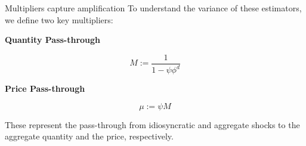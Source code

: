 \documentclass[aspectratio=169,11pt]{beamer}
\begin{document}
\begin{frame}{Multipliers capture amplification}
    \vspace{0.5cm}
    \centering
    To understand the variance of these estimators, we define two key multipliers:

    \vspace{0.8cm}
    \begin{minipage}{0.45\textwidth}
        \centering
        \textbf{Quantity Pass-through}

        \vspace{0.3cm}
        \begin{equation*}
            M := \frac{1}{1 - \psi\phi^d}
        \end{equation*}
    \end{minipage}
    \hfill
    \begin{minipage}{0.45\textwidth}
        \centering
        \textbf{Price Pass-through}

        \vspace{0.3cm}
        \begin{equation*}
            \mu := \psi M
        \end{equation*}
    \end{minipage}

    \vspace{1cm}
    These represent the pass-through from idiosyncratic and aggregate shocks to the aggregate quantity and the price, respectively.
    \vspace{0.1cm}
    \hfill \hyperlink{src_propositions}{}
\end{frame}
\end{document}
